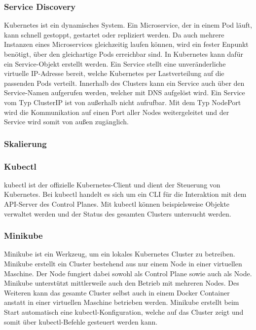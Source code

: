 \subsubsection{Service Discovery}
Kubernetes ist ein dynamisches System. Ein Microservice, der in einem Pod läuft, kann schnell gestoppt, gestartet oder repliziert werden. Da auch mehrere Instanzen eines Microservices gleichzeitig laufen können, wird ein fester Enpunkt benötigt, über den gleichartige Pods erreichbar sind. In Kubernetes kann dafür ein Service-Objekt erstellt werden. Ein Service stellt eine unveränderliche virtuelle IP-Adresse bereit, welche Kubernetes per Lastverteilung auf die passenden Pods verteilt. Innerhalb des Clusters kann ein Service auch über den Service-Namen aufgerufen werden, welcher mit \ac{DNS} aufgelöst wird. Ein Service vom Typ ClusterIP ist von außerhalb nicht aufrufbar. Mit dem Typ NodePort wird die Kommunikation auf einen Port aller Nodes weitergeleitet und der Service wird somit von außen zugänglich.

\subsubsection{Skalierung}



\subsubsection{Kubectl}

kubectl ist der offizielle Kubernetes-Client und dient der Steuerung von Kubernetes. Bei kubectl handelt es sich um ein \ac{CLI} für die Interaktion mit dem \ac{API}-Server des Control Planes. Mit kubectl können beispielsweise Objekte verwaltet werden und der Status des gesamten Clusters untersucht werden.

\subsubsection{Minikube}

Minikube ist ein Werkzeug, um ein lokales Kubernetes Cluster zu betreiben. Minikube erstellt ein Cluster bestehend aus nur einem Node in einer virtuellen Maschine. Der Node fungiert dabei sowohl als Control Plane sowie auch als Node. Minikube unterstützt mittlerweile auch den Betrieb mit mehreren Nodes. Des Weiteren kann das gesamte Cluster selbst auch in einem Docker Container anstatt in einer virtuellen Maschine betrieben werden. Minikube erstellt beim Start automatisch eine kubectl-Konfiguration, welche auf das Cluster zeigt und somit über kubectl-Befehle gesteuert werden kann. 